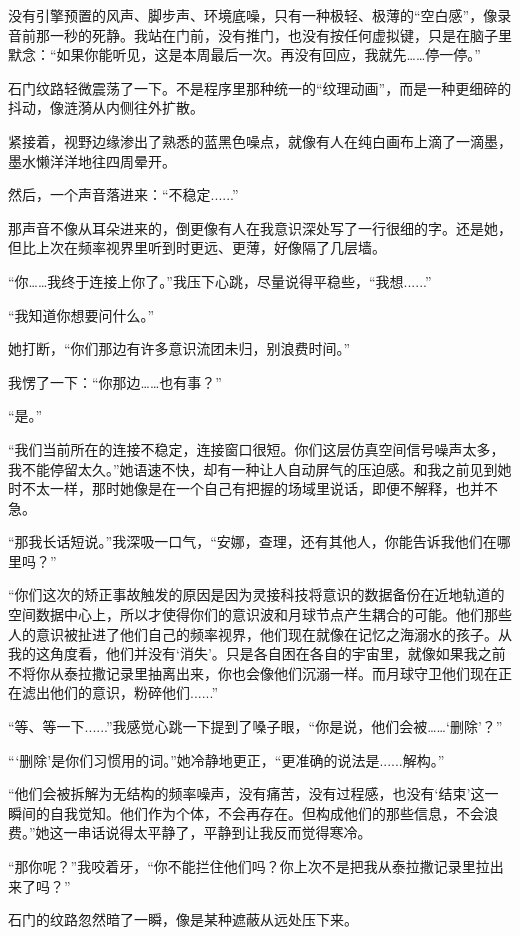 没有引擎预置的风声、脚步声、环境底噪，只有一种极轻、极薄的“空白感”，像录音前那一秒的死静。我站在门前，没有推门，也没有按任何虚拟键，只是在脑子里默念：“如果你能听见，这是本周最后一次。再没有回应，我就先……停一停。”

石门纹路轻微震荡了一下。不是程序里那种统一的“纹理动画”，而是一种更细碎的抖动，像涟漪从内侧往外扩散。

紧接着，视野边缘渗出了熟悉的蓝黑色噪点，就像有人在纯白画布上滴了一滴墨，墨水懒洋洋地往四周晕开。

然后，一个声音落进来：“不稳定......”

那声音不像从耳朵进来的，倒更像有人在我意识深处写了一行很细的字。还是她，但比上次在频率视界里听到时更远、更薄，好像隔了几层墙。

“你……我终于连接上你了。”我压下心跳，尽量说得平稳些，“我想......”

“我知道你想要问什么。”

她打断，“你们那边有许多意识流团未归，别浪费时间。”

我愣了一下：“你那边……也有事？”

“是。”

“我们当前所在的连接不稳定，连接窗口很短。你们这层仿真空间信号噪声太多，我不能停留太久。”她语速不快，却有一种让人自动屏气的压迫感。和我之前见到她时不太一样，那时她像是在一个自己有把握的场域里说话，即便不解释，也并不急。

“那我长话短说。”我深吸一口气，“安娜，查理，还有其他人，你能告诉我他们在哪里吗？”

“你们这次的矫正事故触发的原因是因为灵接科技将意识的数据备份在近地轨道的空间数据中心上，所以才使得你们的意识波和月球节点产生耦合的可能。他们那些人的意识被扯进了他们自己的频率视界，他们现在就像在记忆之海溺水的孩子。从我的这角度看，他们并没有‘消失’。只是各自困在各自的宇宙里，就像如果我之前不将你从泰拉撒记录里抽离出来，你也会像他们沉溺一样。而月球守卫他们现在正在滤出他们的意识，粉碎他们......”

“等、等一下......”我感觉心跳一下提到了嗓子眼，“你是说，他们会被……‘删除’？”

“‘删除’是你们习惯用的词。”她冷静地更正，“更准确的说法是......解构。”

“他们会被拆解为无结构的频率噪声，没有痛苦，没有过程感，也没有‘结束’这一瞬间的自我觉知。他们作为个体，不会再存在。但构成他们的那些信息，不会浪费。”她这一串话说得太平静了，平静到让我反而觉得寒冷。

“那你呢？”我咬着牙，“你不能拦住他们吗？你上次不是把我从泰拉撒记录里拉出来了吗？”

石门的纹路忽然暗了一瞬，像是某种遮蔽从远处压下来。

